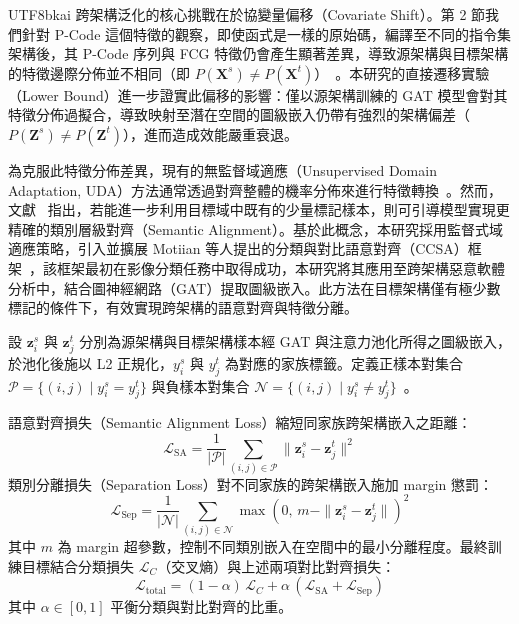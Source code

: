 \documentclass[10pt, a4paper, twocolumn]{article}
\begin{document}
\begin{CJK*}{UTF8}{bkai}
跨架構泛化的核心挑戰在於協變量偏移（Covariate Shift）\cite{shimodaira2000improving}。第 2 節我們針對 P-Code 這個特徵的觀察，即使函式是一樣的原始碼，編譯至不同的指令集架構後，其 P-Code 序列與 FCG 特徵仍會產生顯著差異，導致源架構與目標架構的特徵邊際分佈並不相同（即 $P(\mathbf{X}^s) \neq P(\mathbf{X}^t)$）~\cite{blitzer2006domain}。本研究的直接遷移實驗（Lower Bound）進一步證實此偏移的影響：僅以源架構訓練的 GAT 模型會對其特徵分佈過擬合，導致映射至潛在空間的圖級嵌入仍帶有強烈的架構偏差（$P(\mathbf{Z}^s) \neq P(\mathbf{Z}^t)$），進而造成效能嚴重衰退。

為克服此特徵分佈差異，現有的無監督域適應（Unsupervised Domain Adaptation, UDA）方法通常透過對齊整體的機率分佈來進行特徵轉換~\cite{sun2016deep}。然而，文獻~\cite{motiian2017unified} 指出，若能進一步利用目標域中既有的少量標記樣本，則可引導模型實現更精確的類別層級對齊（Semantic Alignment）。基於此概念，本研究採用監督式域適應策略，引入並擴展 Motiian 等人提出的分類與對比語意對齊（CCSA）框架~\cite{motiian2017unified}，該框架最初在影像分類任務中取得成功，本研究將其應用至跨架構惡意軟體分析中，結合圖神經網路（GAT）提取圖級嵌入。此方法在目標架構僅有極少數標記的條件下，有效實現跨架構的語意對齊與特徵分離。

設 $\mathbf{z}^s_i$ 與 $\mathbf{z}^t_j$ 分別為源架構與目標架構樣本經 GAT 與注意力池化所得之圖級嵌入，於池化後施以 L2 正規化，$y^s_i$ 與 $y^t_j$ 為對應的家族標籤。定義正樣本對集合 $\mathcal{P} = \{(i,j) \mid y^s_i = y^t_j\}$ 與負樣本對集合 $\mathcal{N} = \{(i,j) \mid y^s_i \neq y^t_j\}$~\cite{hadsell2006dimensionality}。

語意對齊損失（Semantic Alignment Loss）縮短同家族跨架構嵌入之距離：
\begin{equation}
  \mathcal{L}_{\text{SA}} = \frac{1}{|\mathcal{P}|}\sum_{(i,j)\in\mathcal{P}} \|\mathbf{z}^s_i - \mathbf{z}^t_j\|^2
\end{equation}
類別分離損失（Separation Loss）對不同家族的跨架構嵌入施加 margin 懲罰：
\begin{equation}
  \mathcal{L}_{\text{Sep}} = \frac{1}{|\mathcal{N}|}\sum_{(i,j)\in\mathcal{N}} \max\!\left(0,\, m - \|\mathbf{z}^s_i - \mathbf{z}^t_j\|\right)^2
\end{equation}
其中 $m$ 為 margin 超參數，控制不同類別嵌入在空間中的最小分離程度。最終訓練目標結合分類損失 $\mathcal{L}_C$（交叉熵）與上述兩項對比對齊損失：
\begin{equation}
  \mathcal{L}_{\text{total}} = (1 - \alpha)\,\mathcal{L}_C + \alpha\,(\mathcal{L}_{\text{SA}} + \mathcal{L}_{\text{Sep}})
\end{equation}
其中 $\alpha \in [0,1]$ 平衡分類與對比對齊的比重。



\end{CJK*}
\end{document}
